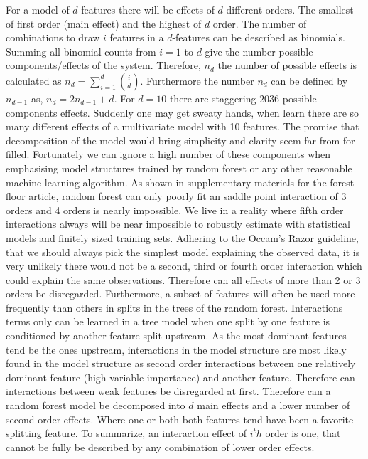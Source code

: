 For a model of $d$ features there will be effects of $d$ different orders. The smallest of first order (main effect) and the highest of $d$ order. The number of combinations to draw $i$ features in a $d$-features can be described as binomials. Summing all binomial counts from $i=1$ to $d$ give the number possible components/effects of the system. Therefore, $n_d$ the number of possible effects is calculated as
$n_d = \sum_{i=1}^{d} \binom{i}{d}$. Furthermore the number $n_d$ can be defined by $n_{d-1}$ as,
$n_d = 2n_{d-1} + d$. For $d=10$ there are staggering $2036$ possible components effects. Suddenly one may get sweaty hands, when learn there are so many different effects of a multivariate model with 10 features. The promise that decomposition of the model would bring simplicity and clarity seem far from for filled. Fortunately we can ignore a high number of these components when emphasising model structures trained by random forest or any other reasonable machine learning algorithm. As shown in supplementary materials for the forest floor article, random forest can only poorly fit an saddle point interaction of 3 orders and 4 orders is nearly impossible. We live in a reality where fifth order interactions always will be near impossible to robustly estimate with statistical models and finitely sized training sets. Adhering to the Occam's Razor guideline, that we should always pick the simplest model explaining the observed data, it is very unlikely there would not be a second, third or fourth order interaction which could explain the same observations. Therefore can all effects of more than 2 or 3 orders be disregarded. Furthermore, a subset of features will often be used more frequently than others in splits in the trees of the random forest. Interactions terms only can be learned in a tree model when one split by one feature is conditioned by another feature split upstream. As the most dominant features tend be the ones upstream, interactions in the model structure are most likely found in the model structure as second order interactions between one relatively dominant feature (high variable importance) and another feature. Therefore can interactions between weak features be disregarded at first. Therefore can a random forest model be decomposed into $d$ main effects and a lower number of second order effects. Where one or both both features tend have been a favorite splitting feature. To summarize, an interaction effect of $i^th$ order is one, that cannot be fully be described by any combination of lower order effects.

